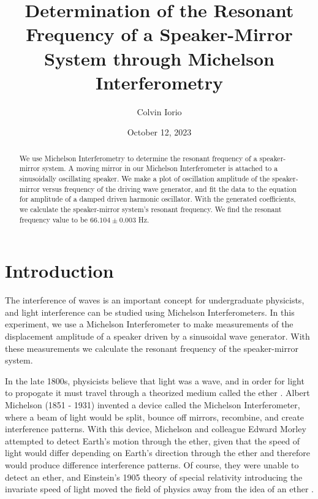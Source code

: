 \documentclass[11pt,letterpaper]{article}
\begin{document}
\title{Determination of the Resonant Frequency of a Speaker-Mirror System through Michelson Interferometry}

\author{Colvin Iorio}

\date{October 12, 2023}
\maketitle


\begin{abstract}
    We use Michelson Interferometry to determine the resonant frequency of a speaker-mirror system. A moving mirror in our Michelson Interferometer is attached to a sinusoidally oscillating speaker. We make a plot of oscillation amplitude of the speaker-mirror versus frequency of the driving wave generator, and fit the data to the equation for amplitude of a damped driven harmonic oscillator. With the generated coefficients, we calculate the speaker-mirror system's resonant frequency. We find the resonant frequency value to be $66.104 \pm 0.003$ Hz.
\end{abstract}


\section{Introduction}\label{sec intro}

The interference of waves is an important concept for undergraduate physicists, and light interference can be studied using Michelson Interferometers. In this experiment, we use a Michelson Interferometer to make measurements of the displacement amplitude of a speaker driven by a sinusoidal wave generator. With these measurements we calculate the resonant frequency of the speaker-mirror system.

In the late 1800s, physicists believe that light was a wave, and in order for light to propogate it must travel through a theorized medium called the ether \cite{Tretkoff}. Albert Michelson (1851 - 1931) invented a device called the Michelson Interferometer, where a beam of light would be split, bounce off mirrors, recombine, and create interference patterns. With this device, Michelson and colleague Edward Morley attempted to detect Earth's motion through the ether, given that the speed of light would differ depending on Earth's direction through the ether and therefore would produce difference interference patterns. Of course, they were unable to detect an ether, and Einstein's 1905 theory of special relativity introducing the invariate speed of light moved the field of physics away from the idea of an ether 
\cite{Tretkoff}.
\end{document}

